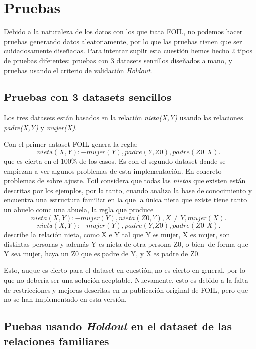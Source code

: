 \section{Pruebas}
Debido a la naturaleza de los datos con los que trata FOIL, no podemos hacer pruebas generando datos aleatoriamente, por lo que las pruebas tienen que ser cuidadosamente diseñadas. Para intentar suplir esta cuestión hemos hecho 2 tipos de pruebas diferentes: pruebas con 3 datasets sencillos diseñados a mano, y pruebas usando el criterio de validación \emph{Holdout}.

\subsection{Pruebas con 3 datasets sencillos}
Los tres datasets están basados en la relación \emph{nieta(X,Y)} usando las relaciones \emph{padre(X,Y)} y \emph{mujer(X)}.

Con el primer dataset FOIL genera la regla:
\begin{equation}
  nieta(X,Y) :- mujer(Y), padre(Y,Z0), padre(Z0,X).
\end{equation}
que es cierta en el 100\% de los casos.
Es con el segundo dataset donde se empiezan a ver algunos problemas de esta implementación. En concreto problemas de sobre ajuste. Foil considera que todas las \emph{nietas} que existen están descritas por los ejemplos, por lo tanto, cuando analiza la base de conocimiento y encuentra una estructura familiar en la que la única nieta que existe tiene tanto un abuelo como una abuela, la regla que produce
\begin{equation}
  nieta(X,Y) :- mujer(Y), nieta(Z0,Y), X \neq Y, mujer(X).
\end{equation}
\begin{equation}
  nieta(X,Y) :- mujer(Y), padre(Y,Z0), padre(Z0,X).
\end{equation}
describe la relación nieta, como X e Y tal que Y es mujer, X es mujer, son distintas personas y además Y es nieta de otra persona Z0, o bien, de forma que Y sea mujer, haya un Z0 que es padre de Y, y X es padre de Z0.

Esto, auque es cierto para el dataset en cuestión, no es cierto en general, por lo que no debería ser una solución aceptable. Nuevamente, esto es debido a la falta de restricciones y mejoras descritas en la publicación original de FOIL, pero que no se han implementado en esta versión.

\subsection{Puebas usando \emph{Holdout} en el dataset de las relaciones familiares}
